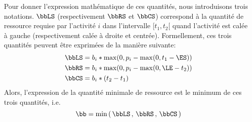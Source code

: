 Pour donner l'expression mathématique de ces quantités, nous
introduisons trois notations. $\bbLS$ (respectivement $\bbRS$ et
$\bbCS$) correspond à la quantité de ressource requise par l'activité $i$
dans l'intervalle $[t_1,t_2[$  quand l'activité est calée à gauche
(respectivement calée à droite et centrée). Formellement, ces trois
quantités peuvent être exprimées de la manière suivante: 
\begin{align}
\bbLS&=b_i * \max(0,p_i- \max(0,t_1 - \ES)) \label{eq:LS_CUSP}\\
\bbRS&=b_i * \max(0,p_i- \max(0, \LE-t_2))\label{eq:RS_CUSP}\\
\bbCS&=b_i * (t_2-t_1)\label{eq:CS_CUSP}
\end{align}
Alors, l'expression de la quantité minimale de ressource est le
minimum de ces trois quantités, i.e.
\begin{equation}
\bb=\min\left(\, \bbLS\, ,\,\bbRS\, ,\,\bbCS \, \right)
\end{equation} 


